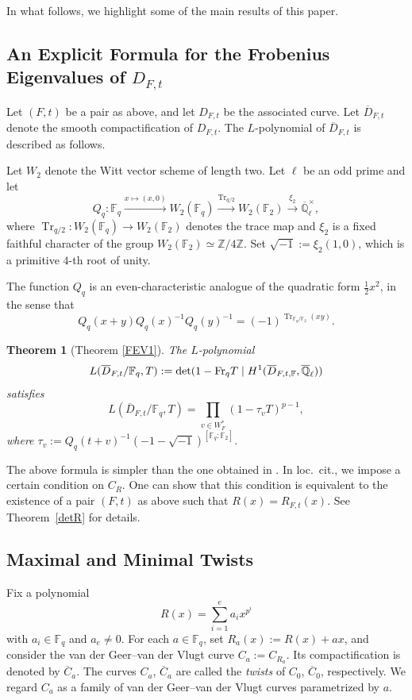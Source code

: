 \documentclass[12pt,a4paper]{amsart}
\newtheorem{theorem}{Theorem}[section]
\theoremstyle{definition}
\def\F{{\mathbb F}}
\def\Ql{\overline{\mathbb{Q}}_\ell}
\theoremstyle{remark}
\DeclareMathOperator{\Tr}{Tr}
\begin{document}
In what follows, we highlight some of the main results of this paper. 


\subsection{An Explicit Formula for the Frobenius Eigenvalues of $D_{F,t}$}

Let $(F,t)$ be a pair as above, and let $D_{F,t}$ be the associated curve. Let $\overline{D}_{F, t}$ denote the smooth compactification of $D_{F, t}$. The $L$-polynomial of $\overline{D}_{F,t}$ is described as follows. 

Let $W_2$ denote the Witt vector scheme of length two. 
Let $\ell$ be an odd prime and  
let 
\[
Q_q \colon \F_q \xrightarrow{x \mapsto (x,0)} W_2(\F_q) \xrightarrow{\Tr_{q/2}} W_2(\F_2) \xrightarrow{\xi_2}
\overline{\mathbb{Q}}^{\times}_{\ell}, 
\]
where $\Tr_{q/2} \colon W_2(\F_q) \to W_2(\F_2)$ denotes the trace map and 
$\xi_2$ is a fixed faithful character of the group $W_2(\F_2) \simeq \mathbb{Z}/4\mathbb{Z}$. Set $\sqrt{-1}:=\xi_2(1,0)$, which is a primitive $4$-th root of unity. 

The function $Q_q$ is an even-characteristic analogue of the quadratic form $\frac{1}{2}x^2$, in the sense that 
\[
Q_q(x+y)Q_q(x)^{-1}Q_q(y)^{-1}=(-1)^{\Tr_{\F_q/\F_2}(xy)}. 
\]
\begin{theorem}[Theorem \ref{FEV1}]\label{thm1 intro}
The $L$-polynomial 
\[
L(\overline{D}_{F,t}/\F_q,T):=\det(1-{\rm Fr}_qT \mid H^1(\overline{D}_{F,t,\F},\Ql))
\]
satisfies 
\[
L(\overline{D}_{F,t}/\F_q,T)=\prod_{v\in W_F^\ast}(1-\tau_vT)^{p-1},
\]
where $\tau_v:=Q_q(t+v)^{-1}(-1-\sqrt{-1})^{[\F_q:\F_2]}$. 
\end{theorem}

The above formula is simpler than the one obtained in  \cite[Theorem 1.1]{ITT0}. In loc.~cit., we impose a certain condition on $C_R$. One can show that this condition is equivalent to the existence of a pair $(F,t)$ as above such that $R(x)=R_{F,t}(x)$. See Theorem~\ref{detR} for details.  

\subsection{Maximal and Minimal Twists}
Fix a polynomial 
\[
R(x)=\sum_{i=1}^ea_ix^{p^i}
\]
with $a_i\in\F_q$ and $a_e\neq0$. For each $a\in \F_q$, set $R_a(x):=R(x)+ax$, and consider the van der Geer--van der Vlugt curve $C_a:=C_{R_a}$. 
Its compactification is denoted by $\overline{C}_{a}$.
The curves $C_{a}$, $\overline{C}_{a}$
are called the \textit{twists} of $C_{0}$, $\overline{C}_{0}$, respectively. 
We regard $C_a$ as a family of van der Geer--van der Vlugt curves parametrized by $a$. 
\end{document}
